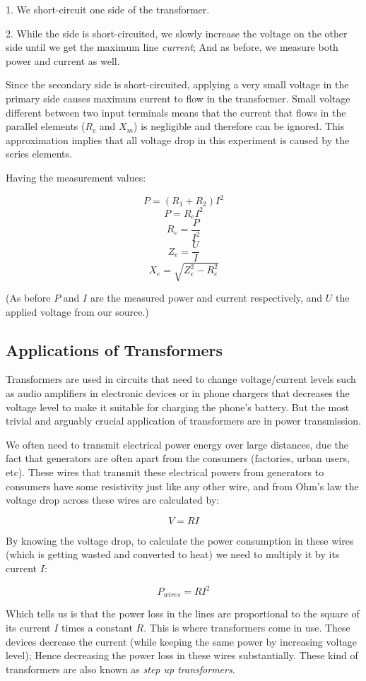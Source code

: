 \documentclass{article}
\begin{document}
	1. We short-circuit one side of the transformer.

	2. While the side is short-circuited, we slowly increase the voltage on the other side until we get the maximum line \textit{current}; And as before, we measure both power and current as well.

	Since the secondary side is short-circuited, applying a very small voltage in the primary side causes maximum current to flow in the transformer.
	Small voltage different between two input terminals means that the current that flows in the parallel elements ($R_c$ and $X_m$) is negligible and therefore can be ignored.
	This approximation implies that all voltage drop in this experiment is caused by the series elements.
	
	Having the measurement values:
	
	$$ P = (R_1 + R_2)I^2 $$
	$$ P = R_e I^2 $$
	$$ R_e = \frac{P}{I^2} $$
	$$ Z_e = \frac{U}{I} $$
	$$ X_e = \sqrt{Z_e^2 - R_e^2}$$

	(As before $P$ and $I$ are the measured power and current respectively, and $U$ the applied voltage from our source.)
	
	
	\subsection{Applications of Transformers}
	Transformers are used in circuits that need to change voltage/current levels such as audio amplifiers in electronic devices or in phone chargers that decreases the voltage level to make it suitable for charging the phone's battery.
	But the most trivial and arguably crucial application of transformers are in power transmission. 
	
	We often need to transmit electrical power energy over large distances, due the fact that generators are often apart from the consumers (factories, urban users, etc). These wires that transmit these electrical powers from generators to consumers have some resistivity just like any other wire, and from Ohm's law the voltage drop across these wires are calculated by:
	
	$$V = RI$$
	
	By knowing the voltage drop, to calculate the power consumption in these wires (which is getting wasted and converted to heat) we need to multiply it by its current $I$:
	
	$$P_{wires} = RI^2 $$
	
	Which tells us is that the power loss in the lines are proportional to the square of its current $I$ times a constant $R$.
	This is where transformers come in use.
	These devices decrease the current (while keeping the same power by increasing voltage level); Hence decreasing the power loss in these wires substantially.
	These kind of transformers are also known as \textit{step up transformers}.
	
\end{document}
